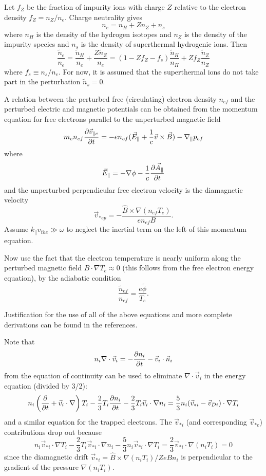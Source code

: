 Let $ f_Z $ be the fraction of impurity ions with charge $Z$
relative to the electron density $ f_Z = n_Z / n_e $.
Charge neutrality gives
\[ n_e = n_H + Z n_Z + n_s \]
where $n_H$ is the density of the hydrogen isotopes and
$n_Z$ is the density of the impurity species and $n_s$ is the density of
superthermal hydrogenic ions.  Then
\[ \frac{\tilde{n}_e}{n_e}
 =  \frac{\tilde{n}_H}{n_e} + \frac{Z \tilde{n}_Z}{n_e}
 =  ( 1 - Z f_Z - f_s ) \frac{\tilde{n}_H}{n_H}
       + Z f_Z \frac{\tilde{n}_Z}{n_Z}  \]
where $ f_s \equiv n_s / n_e $.
For now, it is assumed that the superthermal ions 
do not take part in the perturbation $ \tilde{n}_s = 0.$

A relation between the perturbed free (circulating) electron density 
$ n_{ef} $ and the perturbed electric and magnetic potentials 
can be obtained from the momentum equation for free electrons parallel 
to the unperturbed magnetic field
\[ m_e n_{ef} \frac{\partial \vec{v}_{\parallel e}}{\partial t}
 = -e n_{ef} ( \vec{E}_\parallel + \frac{1}{c} \vec{v} \times \vec{B} )
 - \nabla_\parallel p_{ef} \]
where
\[ \vec{E}_\parallel = - \nabla \phi - \frac{1}{c} \frac{\partial \vec{A}_\parallel}{\partial t} \]
and the unperturbed perpendicular free electron velocity is the 
diamagnetic velocity
\[ \vec{v}_{*ep} = - \frac{\hat{B} \times \nabla ( n_{ef} T_e )}{
   e n_{ef} B}. \]
Assume $ k_\parallel v_{the} \gg \omega $ to neglect the inertial term
on the left of this momentum equation.

Now use the fact that the electron temperature is nearly uniform along
the perturbed magnetic field $ B \cdot \nabla T_e \approx 0 $
(this follows from the free electron energy equation), by the adiabatic
condition
\[ \frac{\tilde{n}_{ef}}{n_{ef}} = \frac{e \tilde{\phi}}{T_e}. \]

Justification for the use of all of the above equations 
and more complete derivations
can be found in the references.\cite{weil92a,nord90a}

Note that 
\[ n_i \nabla \cdot \vec{v}_i = - \frac{\partial n_i}{\partial t} - \vec{v}_i \cdot \vec{n}_i \]
from the equation of continuity can be used to eliminate
$ \nabla \cdot \vec{v}_i $ in the energy equation (divided by 3/2):
\[ n_i \left( \frac{\partial }{\partial t} + \vec{v}_i \cdot \nabla \right) T_i
-\frac{2}{3} T_i \frac{\partial n_i}{\partial t}
 - \frac{2}{3} T_i \vec{v}_i \cdot \nabla n_i
 = \frac{5}{3} n_i ( \vec{v}_{*i} - \vec{v}_{Di} ) \cdot \nabla T_i \]
and a similar equation for the trapped electrons.
The $\vec{v}_{*i}$ (and corresponding $\vec{v}_{*e}$)
contributions drop out because
\[ n_i \vec{v}_{*i} \cdot \nabla T_i
 - \frac{2}{3} T_i \vec{v}_{*i} \cdot \nabla n_i
 - \frac{5}{3} n_i \vec{v}_{*i} \cdot \nabla T_i
 = \frac{2}{3} \vec{v}_{*i} \cdot \nabla ( n_i T_i ) = 0 \]
since the diamagnetic drift
$ \vec{v}_{*i} = \hat{B} \times \nabla ( n_i T_i ) / ZeB n_i $
is perpendicular to the gradient of the pressure
$ \nabla ( n_i T_i ) $.

